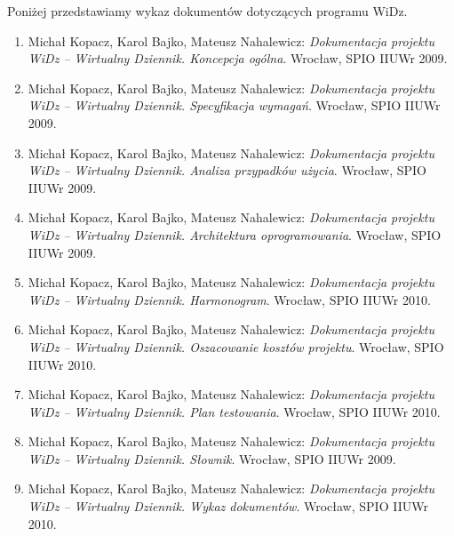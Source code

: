 \documentclass[12pt,leqno,twoside]{mwart}
\begin{document}
\newpage
\vspace{3cm}
Poniżej przedstawiamy wykaz dokumentów dotyczących programu WiDz.
\vspace{0.2cm}
\begin{enumerate}
  \item Michał Kopacz, Karol Bajko, Mateusz Nahalewicz: {\it Dokumentacja projektu WiDz -- Wirtualny Dziennik. Koncepcja ogólna}. Wrocław, SPIO IIUWr 2009.
  \item Michał Kopacz, Karol Bajko, Mateusz Nahalewicz: {\it Dokumentacja projektu WiDz -- Wirtualny Dziennik. Specyfikacja wymagań}. Wrocław, SPIO IIUWr 2009.
  \item Michał Kopacz, Karol Bajko, Mateusz Nahalewicz: {\it Dokumentacja projektu WiDz -- Wirtualny Dziennik. Analiza przypadków użycia}. Wrocław, SPIO IIUWr 2009.
  \item Michał Kopacz, Karol Bajko, Mateusz Nahalewicz: {\it Dokumentacja projektu WiDz -- Wirtualny Dziennik. Architektura oprogramowania}. Wrocław, SPIO IIUWr 2009.
  \item Michał Kopacz, Karol Bajko, Mateusz Nahalewicz: {\it Dokumentacja projektu WiDz -- Wirtualny Dziennik. Harmonogram}. Wrocław, SPIO IIUWr 2010.
  \item Michał Kopacz, Karol Bajko, Mateusz Nahalewicz: {\it Dokumentacja projektu WiDz -- Wirtualny Dziennik. Oszacowanie kosztów projektu}. Wrocław, SPIO IIUWr 2010.
  \item Michał Kopacz, Karol Bajko, Mateusz Nahalewicz: {\it Dokumentacja projektu WiDz -- Wirtualny Dziennik. Plan testowania}. Wrocław, SPIO IIUWr 2010.
  \item Michał Kopacz, Karol Bajko, Mateusz Nahalewicz: {\it Dokumentacja projektu WiDz -- Wirtualny Dziennik. Słownik}. Wrocław, SPIO IIUWr 2009.
  \item Michał Kopacz, Karol Bajko, Mateusz Nahalewicz: {\it Dokumentacja projektu WiDz -- Wirtualny Dziennik. Wykaz dokumentów}. Wrocław, SPIO IIUWr 2010.
\end{enumerate}
	
\end{document}
